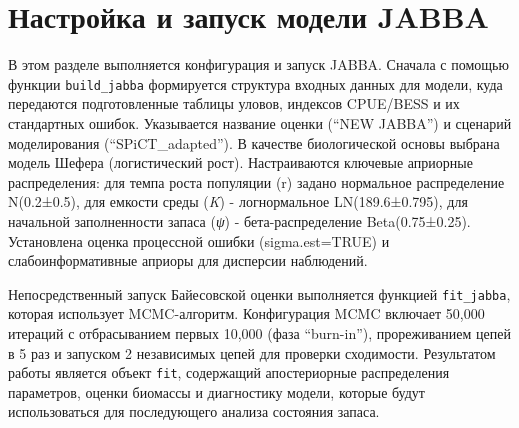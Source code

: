 \documentclass[
  letterpaper,
  DIV=11,
  numbers=noendperiod]{scrreprt}
\begin{document}
\section{Настройка и запуск модели
JABBA}\label{ux43dux430ux441ux442ux440ux43eux439ux43aux430-ux438-ux437ux430ux43fux443ux441ux43a-ux43cux43eux434ux435ux43bux438-jabba}

В этом разделе выполняется конфигурация и запуск JABBA. Сначала с
помощью функции \texttt{build\_jabba} формируется структура входных
данных для модели, куда передаются подготовленные таблицы уловов,
индексов CPUE/BESS и их стандартных ошибок. Указывается название оценки
(``NEW JABBA'') и сценарий моделирования (``SPiCT\_adapted''). В
качестве биологической основы выбрана модель Шефера (логистический
рост). Настраиваются ключевые априорные распределения: для темпа роста
популяции (r) задано нормальное распределение N(0.2±0.5), для емкости
среды (\emph{K}) - логнормальное LN(189.6±0.795), для начальной
заполненности запаса (\emph{ψ}) - бета-распределение Beta(0.75±0.25).
Установлена оценка процессной ошибки (sigma.est=TRUE) и
слабоинформативные априоры для дисперсии наблюдений.

Непосредственный запуск Байесовской оценки выполняется функцией
\texttt{fit\_jabba}, которая использует MCMC-алгоритм. Конфигурация MCMC
включает 50,000 итераций с отбрасыванием первых 10,000 (фаза
``burn-in''), прореживанием цепей в 5 раз и запуском 2 независимых цепей
для проверки сходимости. Результатом работы является объект
\texttt{fit}, содержащий апостериорные распределения параметров, оценки
биомассы и диагностику модели, которые будут использоваться для
последующего анализа состояния запаса.
\end{document}
